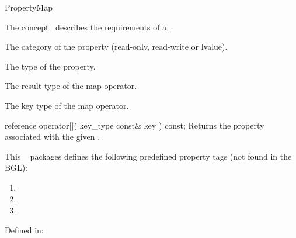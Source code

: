 
\begin{ccRefConcept}{PropertyMap}


\ccDefinition

The concept \ccRefName\ describes the requirements of a .

\ccTypes
   {The category of the property (read-only, read-write or lvalue).}{}
  
   {The type of the property.}{}
    
   {The result type of the map operator.}{}
    
   {The key type of the map operator.}{}


\ccOperations

\ccMethod
  {reference operator[]( key_type const& key ) const;}
  {Returns the property associated with the given .}  

This \cgal\  packages defines the following predefined property tags (not found in the BGL):

\begin{enumerate}
\item {}
\item {}
\item {}
\end{enumerate}

Defined in:
  

\ccHasModels
{}\\
\\
\\
\\
\\

\end{ccRefConcept}



